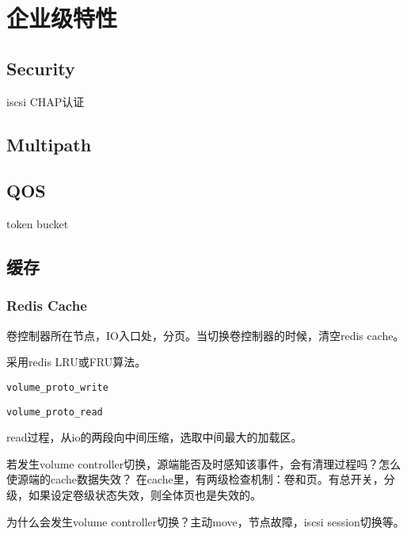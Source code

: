\chapter{企业级特性}

\section{Security}

iscsi CHAP认证

\section{Multipath}

\section{QOS}

token bucket



\section{缓存}

\subsection{Redis Cache}

卷控制器所在节点，IO入口处，分页。当切换卷控制器的时候，清空redis cache。

采用redis LRU或FRU算法。

\begin{compactitem}
    \item \verb|volume_proto_write|
    \item \verb|volume_proto_read|
\end{compactitem}

read过程，从io的两段向中间压缩，选取中间最大的加载区。

若发生volume controller切换，源端能否及时感知该事件，会有清理过程吗？怎么使源端的cache数据失效？
在cache里，有两级检查机制：卷和页。有总开关，分级，如果设定卷级状态失效，则全体页也是失效的。

为什么会发生volume controller切换？主动move，节点故障，iscsi session切换等。

